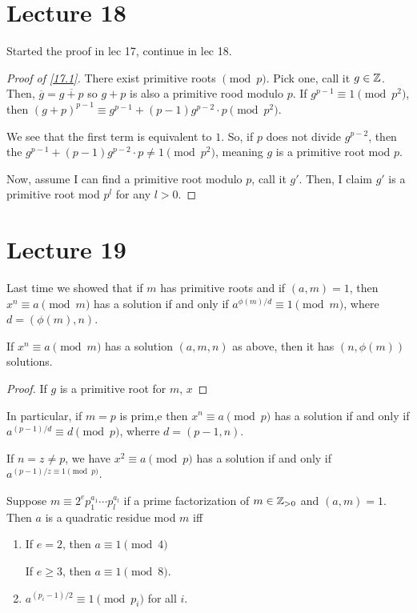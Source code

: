 \documentclass{article}
\begin{document}
\section{Lecture 18}
Started the proof in lec 17, continue in lec 18.
\begin{proof}[Proof of \ref{17.1}]
	There exist primitive roots $\pmod p$. Pick one, call it $g \in \mathbb Z$. Then, $\overline{g} = \overline{g + p}$ so $g + p$ is also a primitive rood modulo $p$. If $g^{p-1} \equiv 1 \pmod{p^2}$, then $(g + p)^{p-1} \equiv g^{p-1} + (p - 1)g^{p-2} \cdot p \pmod{p^2}$.

	We see that the first term is equivalent to $1$. So, if $p$ does not divide $g^{p-2}$, then the $g^{p -1} + (p-1)g^{p-2} \cdot p \neq 1 \pmod{p^2}$, meaning $g$ is a primitive root mod $p$.

	Now, assume I can find a primitive root modulo $p$, call it $g'$. Then, I claim $g'$ is a primitive root mod $p^l$ for any $l > 0$.
\end{proof}

\section{Lecture 19}
Last time we showed that if $m$ has primitive roots and if $(a, m) = 1$, then $x^n \equiv a \pmod m$ has a solution if and only if $a^{\phi(m)/d} \equiv 1 \pmod m$, where $d = (\phi(m), n)$.

\begin{remark}
    If $x^n \equiv a \pmod m$ has a solution $(a, m, n)$ as above, then it has $(n, \phi(m))$ solutions. 
\end{remark}

\begin{proof}
    If $g$ is a primitive root for $m$, $x $
\end{proof}

In particular, if $m = p$ is prim,e then $x^n \equiv a \pmod p$ has a solution if and only if $a^{(p-1)/d} \equiv d \pmod p$, wherre $d = (p-1, n)$.

If $n = z \neq p$, we have $x^2 \equiv a \pmod p$ has a solution if and only if $a^{(p-1)/z \equiv 1 \pmod p}$.

\begin{lemma}
    Suppose $m \equiv 2^e p_1^{a_1} \cdots p_l^{a_l}$ if a prime factorization of $m \in \mathbb Z_{> 0}$ and $(a, m) = 1$. Then $a$ is a quadratic residue mod $m$ iff 
    \begin{enumerate}[label=(\alph*)]
        \item If $e = 2$, then $a \equiv 1 \pmod 4$

        If $e \geq 3$, then $a \equiv 1 \pmod 8$.
        \item $a^{(p_i - 1)/2} \equiv 1 \pmod{p_i}$ for all $i$.
    \end{enumerate}
\end{lemma}
\end{document}
